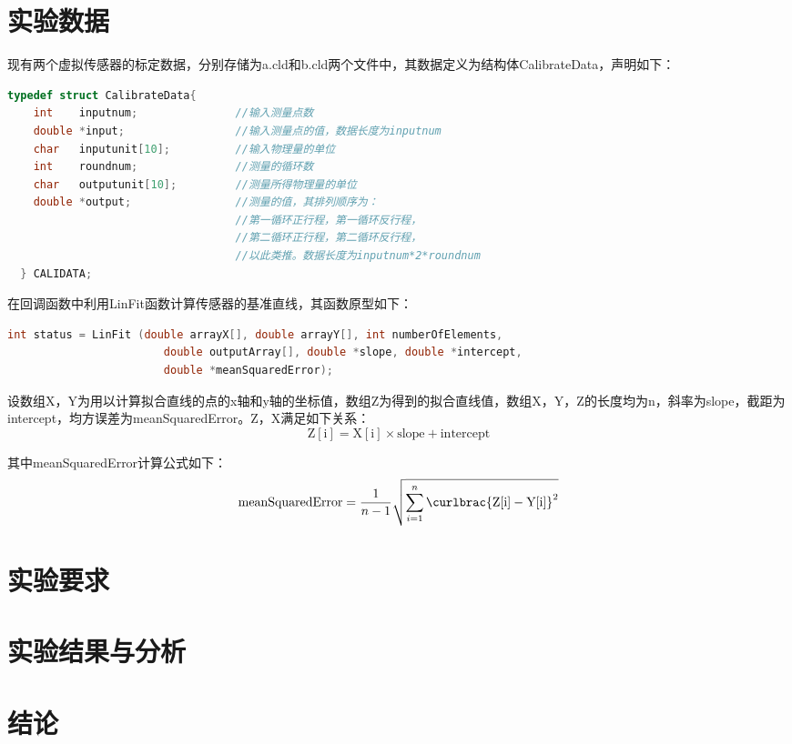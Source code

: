 \documentclass[a4paper,10.5pt,twoside]{article}%
\begin{document}
\section{实验数据}
现有两个虚拟传感器的标定数据，分别存储为a.cld和b.cld两个文件中，其数据定义为结构体CalibrateData，声明如下：
\begin{lstlisting}[language=C]
  typedef struct CalibrateData{
    int    inputnum;               //输入测量点数
    double *input;                 //输入测量点的值，数据长度为inputnum
    char   inputunit[10];          //输入物理量的单位
    int    roundnum;               //测量的循环数
    char   outputunit[10];         //测量所得物理量的单位
    double *output;                //测量的值，其排列顺序为：
                                   //第一循环正行程，第一循环反行程，
                                   //第二循环正行程，第二循环反行程，
                                   //以此类推。数据长度为inputnum*2*roundnum
  } CALIDATA;
\end{lstlisting}\par
在回调函数中利用LinFit函数计算传感器的基准直线，其函数原型如下：
\begin{lstlisting}[language=C]
  int status = LinFit (double arrayX[], double arrayY[], int numberOfElements, 
                        double outputArray[], double *slope, double *intercept, 
                        double *meanSquaredError);
\end{lstlisting}\par
设数组X，Y为用以计算拟合直线的点的x轴和y轴的坐标值，数组Z为得到的拟合直线值，数组X，Y，Z的长度均为n，斜率为slope，截距为intercept，均方误差为meanSquaredError。Z，X满足如下关系：
\begin{equation*}
  \mathrm{Z[i]} = \mathrm{X[i]} \times \mathrm{slope} + \mathrm{intercept}
\end{equation*}\par
其中meanSquaredError计算公式如下：
\begin{equation*}
  \mathrm{meanSquaredError} = \frac{1}{n-1} \sqrt{\sum_{i=1}^{n} \curlbrac{\mathrm{Z[i]} - \mathrm{Y[i]}}^2}
\end{equation*}\par

\newpage
\section{实验要求}

\newpage
\section{实验结果与分析}
\newpage
\section{结论}

\newpage
\printbibliography[heading=bibliography,title=参考文献]
\end{document}
